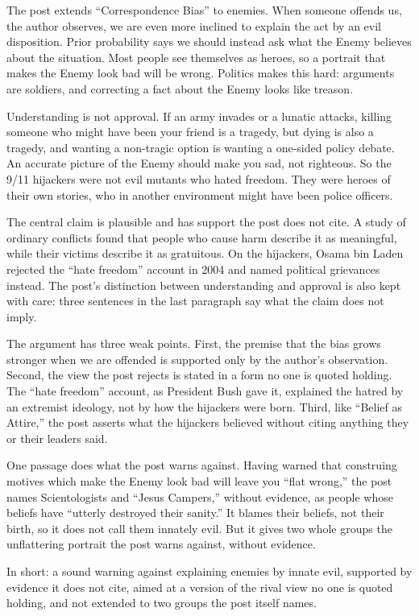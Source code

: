 \begin{afterword}
\summaryhead

The post extends ``Correspondence Bias'' to enemies. When someone offends us, the author observes, we are even more inclined to explain the act by an evil disposition. Prior probability says we should instead ask what the Enemy believes about the situation. Most people see themselves as heroes, so a portrait that makes the Enemy look bad will be wrong. Politics makes this hard: arguments are soldiers, and correcting a fact about the Enemy looks like treason.

Understanding is not approval. If an army invades or a lunatic attacks, killing someone who might have been your friend is a tragedy, but dying is also a tragedy, and wanting a non-tragic option is wanting a one-sided policy debate. An accurate picture of the Enemy should make you sad, not righteous. So the 9/11 hijackers were not evil mutants who hated freedom. They were heroes of their own stories, who in another environment might have been police officers.

\responsehead

The central claim is plausible and has support the post does not cite. A study of ordinary conflicts found that people who cause harm describe it as meaningful, while their victims describe it as gratuitous. On the hijackers, Osama bin Laden rejected the ``hate freedom'' account in 2004 and named political grievances instead. The post's distinction between understanding and approval is also kept with care: three sentences in the last paragraph say what the claim does not imply.

The argument has three weak points. First, the premise that the bias grows stronger when we are offended is supported only by the author's observation. Second, the view the post rejects is stated in a form no one is quoted holding. The ``hate freedom'' account, as President Bush gave it, explained the hatred by an extremist ideology, not by how the hijackers were born. Third, like ``Belief as Attire,'' the post asserts what the hijackers believed without citing anything they or their leaders said.

One passage does what the post warns against. Having warned that construing motives which make the Enemy look bad will leave you ``flat wrong,'' the post names Scientologists and ``Jesus Campers,'' without evidence, as people whose beliefs have ``utterly destroyed their sanity.'' It blames their beliefs, not their birth, so it does not call them innately evil. But it gives two whole groups the unflattering portrait the post warns against, without evidence.

In short: a sound warning against explaining enemies by innate evil, supported by evidence it does not cite, aimed at a version of the rival view no one is quoted holding, and not extended to two groups the post itself names.
\end{afterword}

